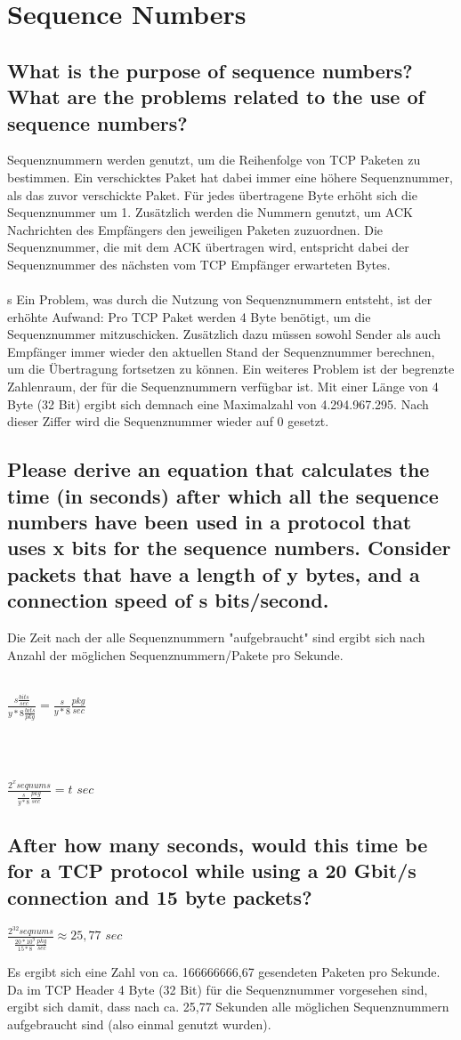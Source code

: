 \documentclass[a4paper,
			llpt,
			solution,
			accentcolor=tud2d,
			colorbacktitle
			]
			{tudexercise}
\begin{document}
\section{Sequence Numbers}
\subsection{What is the purpose of sequence numbers? What are the problems related to the use of sequence numbers?}
Sequenznummern werden genutzt, um die Reihenfolge von TCP Paketen zu bestimmen.  Ein verschicktes Paket hat dabei immer eine höhere Sequenznummer, als das zuvor verschickte Paket.
Für jedes übertragene Byte erhöht sich die Sequenznummer um 1.
Zusätzlich werden die Nummern genutzt, um ACK Nachrichten des Empfängers den jeweiligen Paketen zuzuordnen. Die Sequenznummer, die mit dem ACK übertragen wird, entspricht dabei der Sequenznummer des nächsten vom TCP Empfänger erwarteten Bytes.
\\\\s
Ein Problem, was durch die Nutzung von Sequenznummern entsteht, ist der erhöhte Aufwand: Pro TCP Paket werden 4 Byte benötigt, um die Sequenznummer mitzuschicken. Zusätzlich dazu müssen sowohl Sender als auch Empfänger immer wieder den aktuellen Stand der Sequenznummer berechnen, um die Übertragung fortsetzen zu können.
Ein weiteres Problem ist der begrenzte Zahlenraum, der für die Sequenznummern verfügbar ist. Mit einer Länge von 4 Byte (32 Bit) ergibt sich demnach eine Maximalzahl von 4.294.967.295. Nach dieser Ziffer wird die Sequenznummer wieder auf 0 gesetzt.
\subsection{Please derive an equation that calculates the time (in seconds) after which all the sequence numbers have been used in a protocol that uses x bits for the sequence numbers. Consider packets that have a length of y bytes, and a connection speed of s bits/second.}
Die Zeit nach der alle Sequenznummern "aufgebraucht" sind ergibt sich nach Anzahl der möglichen Sequenznummern/Pakete pro Sekunde.
\\\\
\centerline{
$
    \frac{s \frac{bits}{sec}}{y*8\frac{bits}{pkg}} = \frac{s}{y*8} \frac{pkg}{sec}
$
}
\\
\\

\centerline{
$\frac{2^x seqnums}{\frac{s}{y*8} \frac{pkg}{sec}} = t$ $sec$
}
\subsection{After how many seconds, would this time be for a TCP protocol while using a 20 Gbit/s connection and 15 byte packets?}
\centerline{
$\frac{2^{32} seqnums}{\frac{20*10^9}{15*8} \frac{pkg}{sec}} \approx 25,77$ $sec$
}
Es ergibt sich eine Zahl von ca. 166666666,67 gesendeten Paketen pro Sekunde. Da im TCP Header 4 Byte (32 Bit) für die Sequenznummer vorgesehen sind, ergibt sich damit, dass nach ca. 25,77 Sekunden alle möglichen Sequenznummern aufgebraucht sind (also einmal genutzt wurden).
\clearpage
\end{document}
